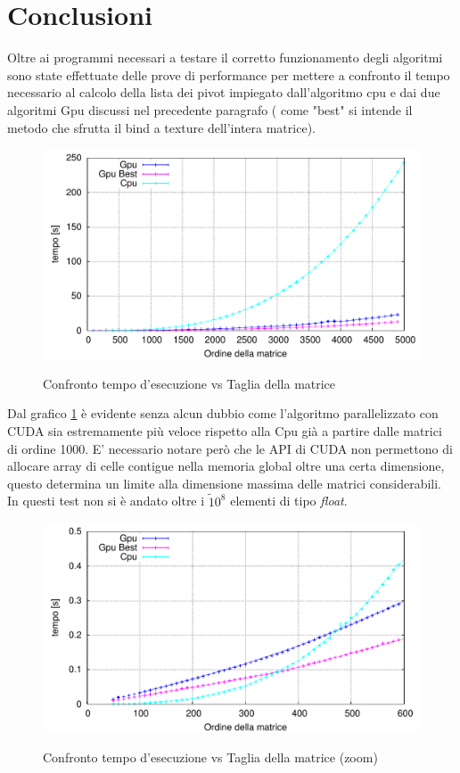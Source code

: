 \documentclass{article}
\begin{document}
\section{Conclusioni}
Oltre ai programmi necessari a testare il corretto funzionamento degli algoritmi sono state effettuate delle prove di performance per mettere a confronto il tempo necessario al calcolo della lista dei pivot impiegato dall'algoritmo cpu e dai due algoritmi Gpu discussi nel precedente paragrafo ( come "best" si intende il metodo che sfrutta il bind a texture dell'intera matrice).
\begin{figure}[ht!]
	\centering
	\caption{Confronto tempo d'esecuzione vs Taglia della matrice}
	\includegraphics[width=180mm]{TimevsN.pdf}
	\label{TimevsN}
\end{figure}
Dal grafico \ref{TimevsN} è evidente senza alcun dubbio come l'algoritmo parallelizzato con CUDA sia estremamente più veloce rispetto alla Cpu già  a partire dalle matrici di ordine 1000. E' necessario notare però che le API di CUDA non permettono di allocare array di celle contigue nella memoria global oltre una certa dimensione, questo determina un limite alla dimensione massima delle matrici considerabili. In questi test non si è andato oltre i $\tilde 10^{8}$ elementi di tipo \emph{float}.
\begin{figure}[ht!]
	\centering
	\caption{Confronto tempo d'esecuzione vs Taglia della matrice (zoom)}
	\includegraphics[width=180mm]{TimevsN_Zoom.pdf}
	\label{Zoom}
\end{figure}
\end{document}
